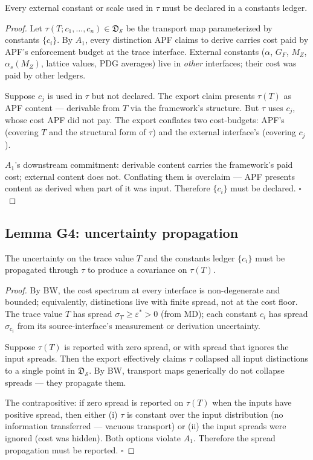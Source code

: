 \begin{lemma}
\label{lem:G3}
Every external constant or scale used in $\tau$ must be declared in a constants ledger.
\end{lemma}

\begin{proof}
Let $\tau(T; c_1, \dots, c_n) \in \mathfrak{D}_{\mathcal{S}}$ be the transport map parameterized by constants $\{c_i\}$. By $A_1$, every distinction APF claims to derive carries cost paid by APF's enforcement budget at the trace interface. External constants ($\alpha$, $G_F$, $M_Z$, $\alpha_s(M_Z)$, lattice values, PDG averages) live in \emph{other} interfaces; their cost was paid by other ledgers.

Suppose $c_j$ is used in $\tau$ but not declared. The export claim presents $\tau(T)$ as APF content --- derivable from $T$ via the framework's structure. But $\tau$ uses $c_j$, whose cost APF did not pay. The export conflates two cost-budgets: APF's (covering $T$ and the structural form of $\tau$) and the external interface's (covering $c_j$).

$A_1$'s downstream commitment: derivable content carries the framework's paid cost; external content does not. Conflating them is overclaim --- APF presents content as derived when part of it was input. Therefore $\{c_i\}$ must be declared. $\square$
\end{proof}

\subsection{Lemma G4: uncertainty propagation}
\label{subsec:lemma-G4}

\begin{lemma}
\label{lem:G4}
The uncertainty on the trace value $T$ and the constants ledger $\{c_i\}$ must be propagated through $\tau$ to produce a covariance on $\tau(T)$.
\end{lemma}

\begin{proof}
By BW, the cost spectrum at every interface is non-degenerate and bounded; equivalently, distinctions live with finite spread, not at the cost floor. The trace value $T$ has spread $\sigma_T \ge \varepsilon^{*} > 0$ (from MD); each constant $c_i$ has spread $\sigma_{c_i}$ from its source-interface's measurement or derivation uncertainty.

Suppose $\tau(T)$ is reported with zero spread, or with spread that ignores the input spreads. Then the export effectively claims $\tau$ collapsed all input distinctions to a single point in $\mathfrak{D}_{\mathcal{S}}$. By BW, transport maps generically do not collapse spreads --- they propagate them.

The contrapositive: if zero spread is reported on $\tau(T)$ when the inputs have positive spread, then either (i) $\tau$ is constant over the input distribution (no information transferred --- vacuous transport) or (ii) the input spreads were ignored (cost was hidden). Both options violate $A_1$. Therefore the spread propagation must be reported. $\square$
\end{proof}


